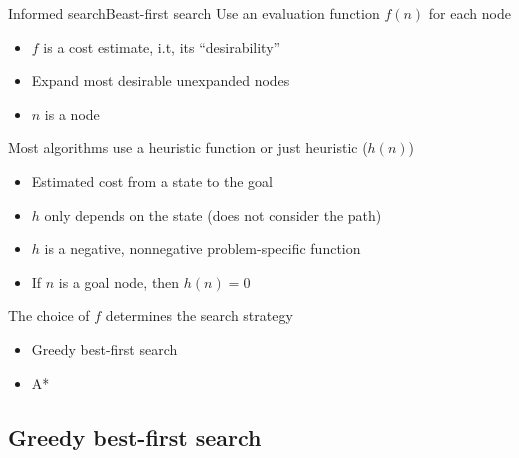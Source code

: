 \documentclass[10pt,compress]{beamer} %
\begin{document}
\begin{frame}{Informed search}{Beast-first search}
    Use an evaluation function $f(n)$ for each node
      \begin{itemize}
        \item $f$ is a cost estimate, i.t, its ``desirability''
        \item Expand most desirable unexpanded nodes
        \item $n$ is a node
      \end{itemize}

    Most algorithms use a \alert{heuristic function} or just \alert{heuristic} ($h(n)$)
      \begin{itemize}
        \item Estimated cost from a state to the goal
        \item $h$ only depends on the state (does not consider the path)
        \item $h$ is a negative, nonnegative problem-specific function
        \item If $n$ is a goal node, then $h(n) = 0$
      \end{itemize}

    The choice of $f$ determines the search strategy
      \begin{itemize}
        \item Greedy best-first search
        \item A*
      \end{itemize}
\end{frame}

\subsection{Greedy best-first search}
\end{document}
